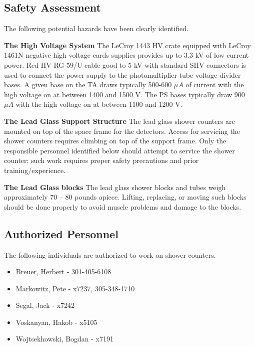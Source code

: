 \subsection{Safety Assessment}
The following potential hazards have been clearly identified.
\begin{description}
\item {\bf The High Voltage System} The LeCroy 1443 HV crate equipped
with LeCroy 1461N negative high voltage cards supplies provides
up to 3.3 kV of low current power.  Red HV RG-59/U cable good to 5 kV with
standard SHV connectors is used to connect the power supply to the
photomultiplier tube voltage divider bases.  A given base on the TA
draws typically 500-600 $\mu A$ of current with the high voltage
on at between 1400 and 1500 V.  The PS bases typically draw 900 $\mu A$
with the high voltage on at between 1100 and 1200 V.

\item {\bf The Lead Glass Support Structure}
The lead glass shower counters are mounted on top of the space
frame for the detectors.  Access for servicing the shower counters
requires climbing on top of the support frame.  Only the responsible
personnel identified below should attempt to service the shower counter;
such work requires proper safety precautions and prior training/experience.

\item {\bf The Lead Glass blocks}
The lead glass shower blocks and tubes weigh approximately 70 -- 80 pounds
apiece.  Lifting, replacing, or moving such blocks should
be done properly to avoid muscle problems and damage to the blocks.

\end{description}

\subsection{Authorized Personnel} 
The following individuals are authorized to work on shower counters. 
\begin{itemize} 
\item[~]Breuer, Herbert - 301-405-6108 
\item[~]Markowitz, Pete - x7237, 305-348-1710
\item[~]Segal, Jack - x7242 
\item[~]Voskanyan, Hakob - x5105
\item[~]Wojtsekhowski, Bogdan - x7191 
\end{itemize} 

